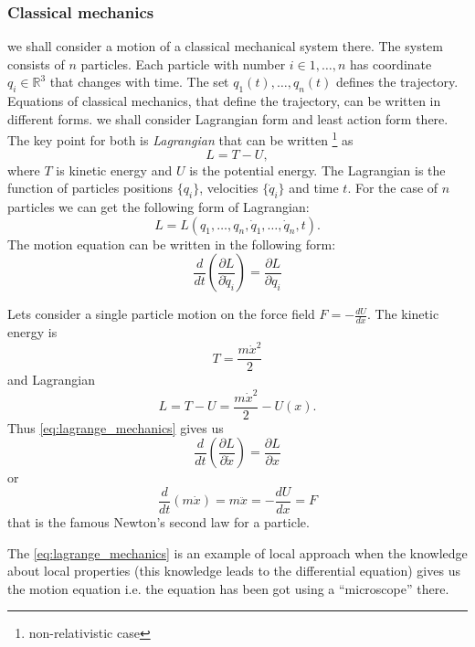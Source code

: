 \subsubsection{Classical mechanics}
we shall consider a motion of a classical mechanical system there. The
system consists of $n$ particles. Each particle with number $i \in {1,
  \dots, n}$ has coordinate $q_i \in \mathbb{R}^3$ that changes with
time. The set ${q_1(t), \dots, q_n(t)}$ defines the trajectory.
Equations of classical mechanics, that define the trajectory, can be
written in different forms. we shall 
consider Lagrangian form and least action form there. The key point
for both is \textit{Lagrangian} that can be
written \footnote{non-relativistic case} 
as 
\[
L = T - U,
\]
where $T$ is kinetic energy and $U$ is the potential energy. The
Lagrangian is the function of particles positions $\{q_i\}$,
velocities $\{\dot{q}_i\}$ and
time $t$. For the case of $n$ particles we can get the following form
of Lagrangian:
\[
L = L\left(q_1, \dots, q_n, \dot{q}_1, \dots, \dot{q}_n, t\right).
\]
The motion equation can be written in the following form:
\begin{equation}
\label{eq:lagrange_mechanics}
\frac{d}{dt}\left(
\frac{\partial L}{\partial \dot{q}_i} \right)
= \frac{\partial L}{\partial q_i}
\end{equation}
\begin{example}
Lets consider a single particle motion on the force field $F = -
\frac{d U}{d x}$.
The kinetic energy is
\[
T = \frac{m \dot{x}^2}{2}
\]
and Lagrangian
\[
L = T - U = \frac{m \dot{x}^2}{2} - U(x).
\]
Thus \eqref{eq:lagrange_mechanics} gives us
\[
\frac{d}{dt}\left(
\frac{\partial L}{\partial \dot{x}} \right)
= \frac{\partial L}{\partial x}
\]
or
\[
\frac{d}{dt}\left(m \dot{x}\right) = m \ddot{x} =
- \frac{d U}{d x} = F
\]
that is the famous Newton's second law for a particle. 
\end{example}

The \eqref{eq:lagrange_mechanics} is an example of local approach when
the knowledge about local properties (this knowledge leads to the
differential equation) gives us the motion equation i.e. the equation
has been got using a ``microscope'' there.

